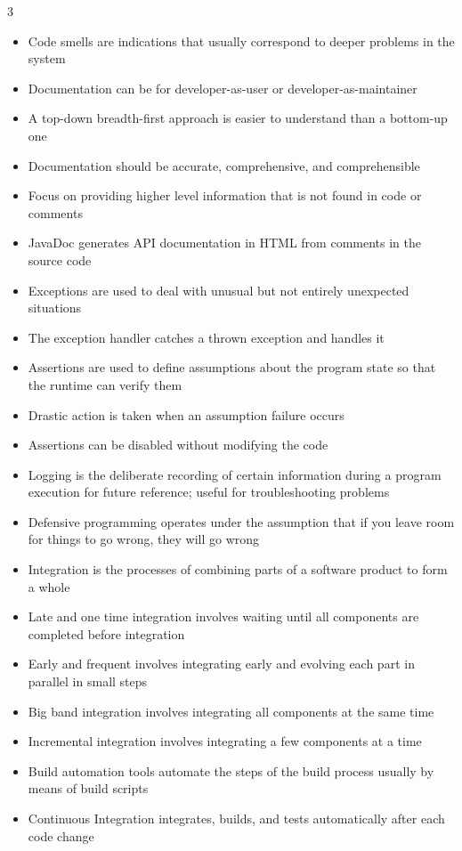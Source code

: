 \documentclass[10pt, landscape]{article}
\begin{document}
\begin{multicols*}{3}
\begin{itemize}
    \item Code smells are indications that usually correspond to deeper problems in the system
    \item Documentation can be for developer-as-user or developer-as-maintainer
    \item A top-down breadth-first approach is easier to understand than a bottom-up one
    \item Documentation should be accurate, comprehensive, and comprehensible
    \item Focus on providing higher level information that is not found in code or comments
    \item JavaDoc generates API documentation in HTML from comments in the source code
    \item Exceptions are used to deal with unusual but not entirely unexpected situations
    \item The exception handler catches a thrown exception and handles it
    \item Assertions are used to define assumptions about the program state so that the runtime can verify them
    \item Drastic action is taken when an assumption failure occurs
    \item Assertions can be disabled without modifying the code
    \item Logging is the deliberate recording of certain information during a program execution for future reference; useful for troubleshooting problems
    \item Defensive programming operates under the assumption that if you leave room for things to go wrong, they will go wrong
    \item Integration is the processes of combining parts of a software product to form a whole
    \item Late and one time integration involves waiting until all components are completed before integration
    \item Early and frequent involves integrating early and evolving each part in parallel in small steps
    \item Big band integration involves integrating all components at the same time
    \item Incremental integration involves integrating a few components at a time
    \item Build automation tools automate the steps of the build process usually by means of build scripts
    \item Continuous Integration integrates, builds, and tests automatically after each code change

\end{itemize}
\end{multicols*}
\end{document}
